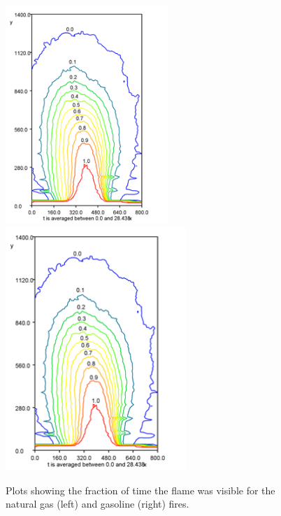 \documentclass[twoside]{uocthesis}
\begin{document}
{\begin{figure}
  \includegraphics[width=2.42in]{../Figures/Fig20}
  \includegraphics[width=2.7in]{../Figures/Fig21} \\
  \caption[Visibility fractions for the natural gas and gasoline fires]{Plots showing the fraction of time the flame was visible for the natural gas (left) and gasoline (right) fires.}
  \label{Gas_and_Gasoline_Contours}
\end{figure}

}
\end{document}
